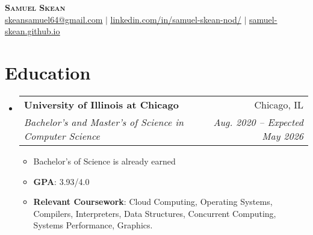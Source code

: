 \documentclass[letterpaper,11pt]{article}
\makeatletter
\newcommand{\resumeSubheading}[4]{
  \vspace{-2pt}\item
    \begin{tabular*}{0.97\textwidth}[t]{l@{\extracolsep{\fill}}r}
      \textbf{#1} & #2 \\
      \textit{\small#3} & \textit{\small #4} \\
    \end{tabular*}\vspace{-7pt}
}
\newcommand{\resumeSubHeadingListStart}{\begin{itemize}[leftmargin=0.15in, label={}]}
\newcommand{\resumeSubHeadingListEnd}{\end{itemize}}
\makeatother
\begin{document}

\begin{center}
    \textbf{\Huge \scshape Samuel Skean} \\ \vspace{1pt} \href{mailto:skeansamuel64@gmail.com}{\underline{skeansamuel64@gmail.com}} $|$ 
    \href{https://www.linkedin.com/in/samuel-skean-nod/}{\underline{linkedin.com/in/samuel-skean-nod/}} $|$ \href{https://samuel-skean.github.io}{\underline{samuel-skean.github.io}}
\end{center}


\section{Education}
  \resumeSubHeadingListStart
    \resumeSubheading
      {University of Illinois at Chicago}{Chicago, IL}
      {Bachelor's and Master's of Science in Computer Science}{Aug. 2020 -- Expected May 2026}
      \begin{itemize}
        \item Bachelor's of Science is already earned
        \item \textbf{GPA}{: 3.93/4.0}
        \item \textbf{Relevant Coursework}: Cloud Computing, Operating Systems, Compilers, Interpreters, Data Structures, Concurrent Computing, Systems Performance, Graphics.
      \end{itemize}
  \resumeSubHeadingListEnd
\end{document}
